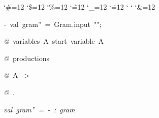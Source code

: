 \begin{list}{}
{\setlength{\leftmargin}{\leftmargini}
\setlength{\rightmargin}{0cm}
\setlength{\itemindent}{0cm}
\setlength{\listparindent}{0cm}
\setlength{\itemsep}{0cm}
\setlength{\parsep}{0cm}
\setlength{\labelsep}{0cm}
\setlength{\labelwidth}{0cm}
\catcode`\#=12
\catcode`\$=12
\catcode`\%=12
\catcode`\^=12
\catcode`\_=12
\catcode`\.=12
\catcode`
\catcode`
\catcode`\&=12
\ttfamily}
\small
\item[]\textsl{-\ }val\ gram''\ =\ Gram.input\ "";
\item[]\textsl{@\ }variables\ A\ start\ variable\ A
\item[]\textsl{@\ }productions
\item[]\textsl{@\ }A\ ->\ %
\item[]\textsl{@\ }.
\item[]\textsl{val\ gram''\ =\ -\ :\ gram}
\end{list}
